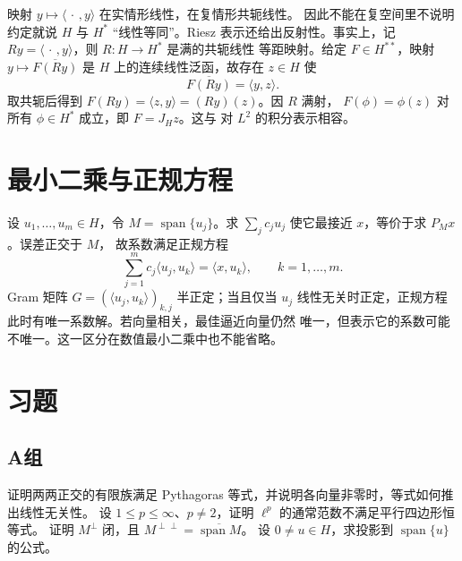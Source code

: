 映射 \(y\mapsto\langle\,\cdot\,,y\rangle\) 在实情形线性，在复情形共轭线性。
因此不能在复空间里不说明约定就说 \(H\) 与 \(H^*\) “线性等同”。Riesz
表示还给出反射性。事实上，记
\(Ry=\langle\,\cdot\,,y\rangle\)，则 \(R:H\to H^*\) 是满的共轭线性
等距映射。给定 \(F\in H^{**}\)，映射
\(y\mapsto\overline{F(Ry)}\) 是 \(H\) 上的连续线性泛函，故存在
\(z\in H\) 使
\[
 \overline{F(Ry)}=\langle y,z\rangle.
\]
取共轭后得到 \(F(Ry)=\langle z,y\rangle=(Ry)(z)\)。因 \(R\) 满射，
\(F(\phi)=\phi(z)\) 对所有 \(\phi\in H^*\) 成立，即 \(F=J_Hz\)。这与
对 \(L^2\) 的积分表示相容。

\section{最小二乘与正规方程}

设 \(u_1,\ldots,u_m\in H\)，令 \(M=\operatorname{span}\{u_j\}\)。求
\(\sum_jc_ju_j\) 使它最接近 \(x\)，等价于求 \(P_Mx\)。误差正交于 \(M\)，
故系数满足正规方程
\[
 \sum_{j=1}^m c_j\langle u_j,u_k\rangle=\langle x,u_k\rangle,
 \qquad k=1,\ldots,m.
\]
Gram 矩阵 \(G=(\langle u_j,u_k\rangle)_{k,j}\) 半正定；当且仅当 \(u_j\)
线性无关时正定，正规方程此时有唯一系数解。若向量相关，最佳逼近向量仍然
唯一，但表示它的系数可能不唯一。这一区分在数值最小二乘中也不能省略。

\section*{习题}
\subsection*{A组}
\begin{enumerate}[label=\textbf{\thechapter.\arabic*.}]
证明两两正交的有限族满足 Pythagoras 等式，并说明各向量非零时，等式如何推出线性无关性。
设 \(1\le p\le\infty\)、\(p\ne2\)，证明 \(\ell^p\) 的通常范数不满足平行四边形恒等式。
证明 \(M^\perp\) 闭，且 \(M^{\perp\perp}=\overline{\operatorname{span}M}\)。
设 \(0\ne u\in H\)，求投影到 \(\operatorname{span}\{u\}\) 的公式。
\end{enumerate}
